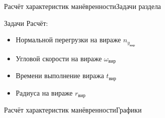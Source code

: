 \begin{frame}{Расчёт характеристик манёвренности}{Задачи раздела}
    \begin{block}{Задачи}
        Расчёт:
        \begin{itemize}
            \item Нормальной перегрузки на вираже $n_{y_\text{вир}}$
            \item Угловой скорости на вираже $\omega_\text{вир}$
            \item Времени выполнение виража $t_\text{вир}$
            \item Радиуса на вираже $r_\text{вир}$
        \end{itemize}
    \end{block}
\end{frame}

\begin{frame}{Расчёт характеристик манёвренности}{Графики}
    \begin{minipage}[c]{0.45\textwidth}
    \end{minipage}  
\end{frame}